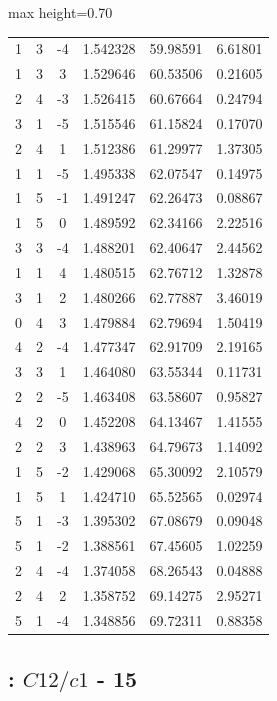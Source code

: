 \documentclass[twoside,a4paper,11pt,addpoints,answers]{exam}%
\begin{document}
\begin{center}
\begin{adjustbox}{max height=0.70\textwidth}
\begin{tabular}{cccccc}
 1 & 3 & -4 &  1.542328 &  59.98591 &   6.61801 \\
 1 & 3 &  3 &  1.529646 &  60.53506 &   0.21605 \\
 2 & 4 & -3 &  1.526415 &  60.67664 &   0.24794 \\
 3 & 1 & -5 &  1.515546 &  61.15824 &   0.17070 \\
 2 & 4 &  1 &  1.512386 &  61.29977 &   1.37305 \\
 1 & 1 & -5 &  1.495338 &  62.07547 &   0.14975 \\
 1 & 5 & -1 &  1.491247 &  62.26473 &   0.08867 \\
 1 & 5 &  0 &  1.489592 &  62.34166 &   2.22516 \\
 3 & 3 & -4 &  1.488201 &  62.40647 &   2.44562 \\
 1 & 1 &  4 &  1.480515 &  62.76712 &   1.32878 \\
 3 & 1 &  2 &  1.480266 &  62.77887 &   3.46019 \\
 0 & 4 &  3 &  1.479884 &  62.79694 &   1.50419 \\
 4 & 2 & -4 &  1.477347 &  62.91709 &   2.19165 \\
 3 & 3 &  1 &  1.464080 &  63.55344 &   0.11731 \\
 2 & 2 & -5 &  1.463408 &  63.58607 &   0.95827 \\
 4 & 2 &  0 &  1.452208 &  64.13467 &   1.41555 \\
 2 & 2 &  3 &  1.438963 &  64.79673 &   1.14092 \\
 1 & 5 & -2 &  1.429068 &  65.30092 &   2.10579 \\
 1 & 5 &  1 &  1.424710 &  65.52565 &   0.02974 \\
 5 & 1 & -3 &  1.395302 &  67.08679 &   0.09048 \\
 5 & 1 & -2 &  1.388561 &  67.45605 &   1.02259 \\
 2 & 4 & -4 &  1.374058 &  68.26543 &   0.04888 \\
 2 & 4 &  2 &  1.358752 &  69.14275 &   2.95271 \\
 5 & 1 & -4 &  1.348856 &  69.72311 &   0.88358 \\
\bottomrule
\end{tabular}
\end{adjustbox}
\end{center}

\subsection{ : $C12/c1$ - 15}
\end{document}
